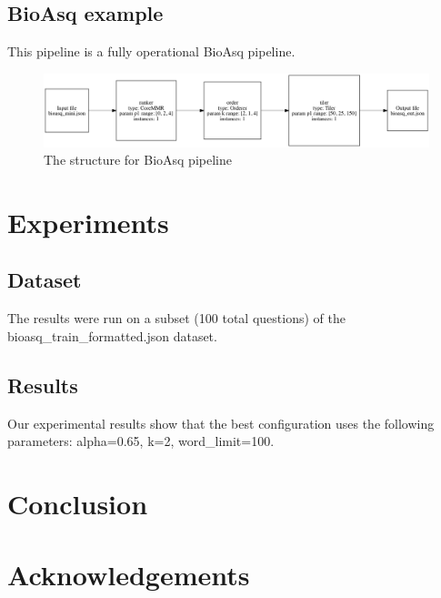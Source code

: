 \documentclass{article}
\begin{document}
    \subsection{BioAsq example}
    This pipeline is a fully operational BioAsq pipeline.

    \begin{figure}[H]
        \begin{center}
            \includegraphics[width=\textwidth]{fig/bioasq_pipeline.png}
        \end{center}
        \label{fig:bioasq_pipeline}
        \caption{The structure for BioAsq pipeline}
    \end{figure}


\section{Experiments}
    \subsection{Dataset}
    The results were run on a subset (100 total questions) of the bioasq_train_formatted.json dataset.
    \subsection{Results}
    Our experimental results show that the best configuration uses the following parameters: alpha=0.65, k=2, word_limit=100.

\section{Conclusion}

\section*{Acknowledgements}
\end{document}
